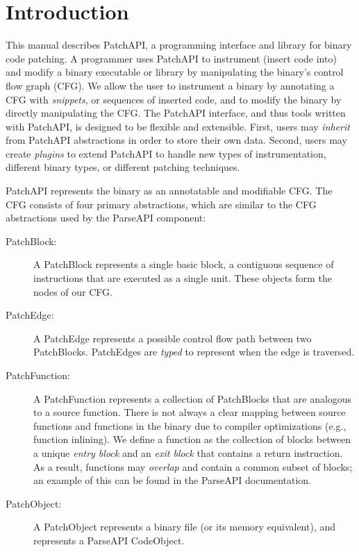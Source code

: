 \documentclass[11pt]{article}
\begin{document}
\tableofcontents
\clearpage

\section{Introduction}
\label{sec-1}

This manual describes PatchAPI, a programming interface and library
for binary code patching. A programmer uses PatchAPI to instrument
(insert code into) and modify a binary executable or library by
manipulating the binary's control flow graph (CFG). We allow the user
to instrument a binary by annotating a CFG with \emph{snippets}, or
sequences of inserted code, and to modify the binary by directly
manipulating the CFG. The PatchAPI interface, and thus tools written
with PatchAPI, is designed to be flexible and extensible. First, users
may \emph{inherit} from PatchAPI abstractions in order to store their
own data. Second, users may create \emph{plugins} to extend PatchAPI
to handle new types of instrumentation, different binary types, or
different patching techniques. 

PatchAPI represents the binary as an annotatable and modifiable
CFG. The CFG consists of four primary abstractions, which are similar
to the CFG abstractions used by the ParseAPI component:
\begin{description}
\item[PatchBlock:] A PatchBlock represents a single basic block, a
  contiguous sequence of instructions that are executed as a single
  unit. These objects form the nodes of our CFG. 
\item[PatchEdge:] A PatchEdge represents a possible control flow path
  between two PatchBlocks. PatchEdges are \emph{typed} to represent
  when the edge is traversed. 
\item[PatchFunction:] A PatchFunction represents a collection of
  PatchBlocks that are analogous to a source function. There is not
  always a clear mapping between source functions and functions in the
  binary due to compiler optimizations (e.g., function inlining). We
  define a function as the collection of blocks between a unique
  \emph{entry block} and an \emph{exit block} that contains a return
  instruction. As a result, functions may \emph{overlap} and contain
  a common subset of blocks; an example of this can be found in the
  ParseAPI documentation.
\item[PatchObject:] A PatchObject represents a binary file (or its
  memory equivalent), and represents a ParseAPI CodeObject.
\end{description}
\end{document}
